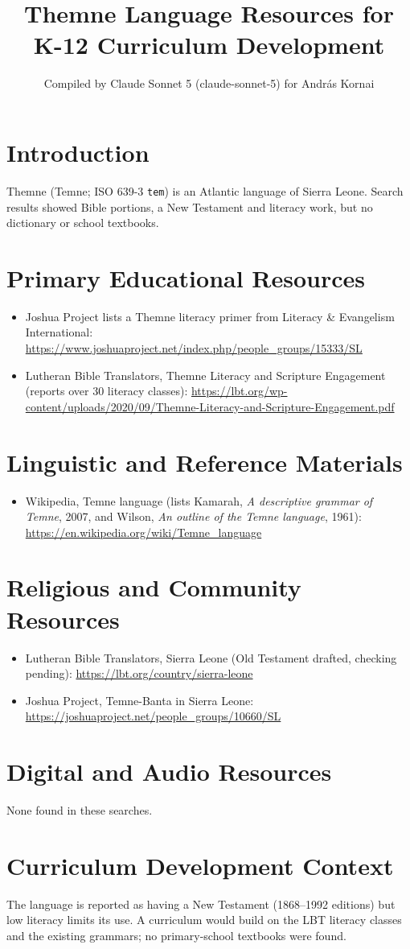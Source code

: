 \documentclass[12pt]{article}
\title{Themne Language Resources for K-12 Curriculum Development}
\author{Compiled by Claude Sonnet 5 (claude-sonnet-5) for Andr\'as Kornai}
\date{}
\begin{document}
\maketitle
\section{Introduction}
Themne (Temne; ISO 639-3 \texttt{tem}) is an Atlantic language of Sierra Leone. Search results showed Bible portions, a New Testament and literacy work, but no dictionary or school textbooks.
\section{Primary Educational Resources}
\begin{itemize}
\item Joshua Project lists a Themne literacy primer from Literacy \& Evangelism International: \url{https://www.joshuaproject.net/index.php/people_groups/15333/SL}
\item Lutheran Bible Translators, Themne Literacy and Scripture Engagement (reports over 30 literacy classes): \url{https://lbt.org/wp-content/uploads/2020/09/Themne-Literacy-and-Scripture-Engagement.pdf}
\end{itemize}
\section{Linguistic and Reference Materials}
\begin{itemize}
\item Wikipedia, Temne language (lists Kamarah, \emph{A descriptive grammar of Temne}, 2007, and Wilson, \emph{An outline of the Temne language}, 1961): \url{https://en.wikipedia.org/wiki/Temne_language}
\end{itemize}
\section{Religious and Community Resources}
\begin{itemize}
\item Lutheran Bible Translators, Sierra Leone (Old Testament drafted, checking pending): \url{https://lbt.org/country/sierra-leone}
\item Joshua Project, Temne-Banta in Sierra Leone: \url{https://joshuaproject.net/people_groups/10660/SL}
\end{itemize}
\section{Digital and Audio Resources}
None found in these searches.
\section{Curriculum Development Context}
The language is reported as having a New Testament (1868--1992 editions) but low literacy limits its use. A curriculum would build on the LBT literacy classes and the existing grammars; no primary-school textbooks were found.
\end{document}
